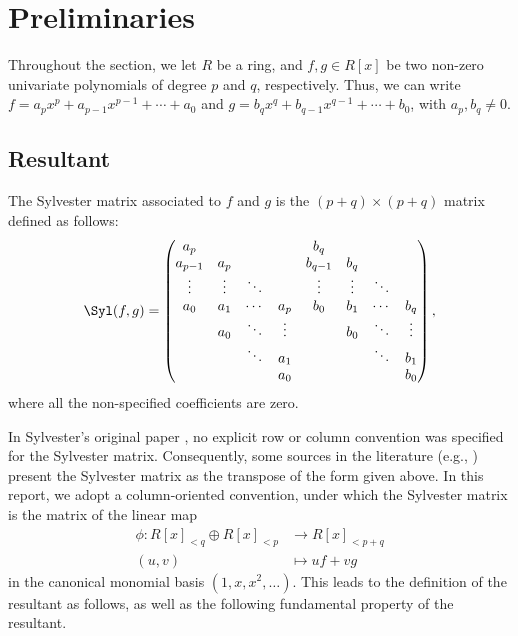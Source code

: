 \section{Preliminaries}

Throughout the section, we let $R$ be a ring, and $f,g\in R[x]$ be two non-zero univariate polynomials of degree $p$ and $q$, respectively. Thus, we can write $f=a_p x^p + a_{p-1} x^{p-1} + \cdots + a_0$ and $g=b_q x^q + b_{q-1} x^{q-1} + \cdots + b_0$, with $a_p, b_q \neq 0$.

\subsection{Resultant}

\begin{definition}
    The Sylvester matrix associated to $f$ and $g$ is the $(p+q)\times(p+q)$ matrix defined as follows:
    \begin{equation*}
        \Syl(f,g)=
        \begin{pmatrix}
            a_p     &        &        &        & b_q     &        &        &        \\
            a_{p-1} & a_p    &        &        & b_{q-1} & b_q    &        &        \\
            \vdots  & \vdots & \ddots &        & \vdots  & \vdots & \ddots &        \\
            a_0     & a_1    & \cdots & a_p    & b_0     & b_1    & \cdots & b_q    \\
                    & a_0    & \ddots & \vdots &         & b_0    & \ddots & \vdots \\
                    &        & \ddots & a_1    &         &        & \ddots & b_1    \\
                    &        &        & a_0    &         &        &        & b_0
        \end{pmatrix},
    \end{equation*}
    where all the non-specified coefficients are zero.
\end{definition}

In Sylvester's original paper \cite{sylvester1853xviii}, no explicit row or column convention was specified for the Sylvester matrix. Consequently, some sources in the literature (e.g., \cite{basu2006algorithms}) present the Sylvester matrix as the transpose of the form given above. In this report, we adopt a column-oriented convention, under which the Sylvester matrix is the matrix of the linear map
\begin{align*}
    \phi : R[x]_{<q} \oplus R[x]_{<p} & \to R[x]_{<p+q} \\
    (u,v)                             & \mapsto uf + vg
\end{align*}
in the canonical monomial basis $(1,x,x^2,\ldots)$. This leads to the definition of the resultant as follows, as well as the following fundamental property of the resultant.

